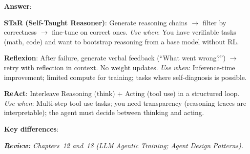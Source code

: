 \begin{questionbox}
\textbf{Answer}:

\textbf{STaR (Self-Taught Reasoner)}: Generate reasoning chains $\to$ filter by correctness $\to$ fine-tune on correct ones. \emph{Use when}: You have verifiable tasks (math, code) and want to bootstrap reasoning from a base model without RL.

\textbf{Reflexion}: After failure, generate verbal feedback (``What went wrong?'') $\to$ retry with reflection in context. No weight updates. \emph{Use when}: Inference-time improvement; limited compute for training; tasks where self-diagnosis is possible.

\textbf{ReAct}: Interleave Reasoning (think) + Acting (tool use) in a structured loop. \emph{Use when}: Multi-step tool use tasks; you need transparency (reasoning traces are interpretable); the agent must decide between thinking and acting.

\textbf{Key differences}:


\emph{\textbf{Review:} Chapters~12 and~18 (LLM Agentic Training; Agent Design Patterns).}
\end{questionbox}

